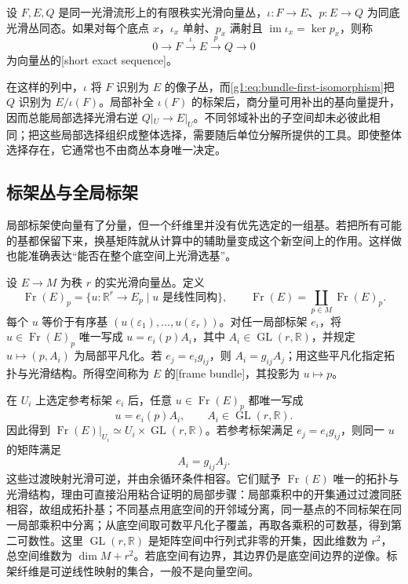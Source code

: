 \begin{definition}
	\label{g1:def:short-exact-bundle-sequence}
	设 \(F,E,Q\) 是同一光滑流形上的有限秩实光滑向量丛，\(\iota:F\to E\)、\(p:E\to Q\) 为同底光滑丛同态。如果对每个底点 \(x\)，\(\iota_x\) 单射、\(p_x\) 满射且 \(\operatorname{im}\iota_x=\ker p_x\)，则称
	\[
		0\longrightarrow F\xrightarrow{\ \iota\ }E\xrightarrow{\ p\ }Q\longrightarrow0
	\]
	为向量丛的[short exact sequence]。
\end{definition}

在这样的列中，\(\iota\) 将 \(F\) 识别为 \(E\) 的像子丛，而\eqref{g1:eq:bundle-first-isomorphism}把 \(Q\) 识别为 \(E/\iota(F)\)。局部补全 \(\iota(F)\) 的标架后，商分量可用补出的基向量提升，因而总能局部选择光滑右逆 \(Q|_U\to E|_U\)。不同邻域补出的子空间却未必彼此相同；把这些局部选择组织成整体选择，需要随后单位分解所提供的工具。即使整体选择存在，它通常也不由商丛本身唯一决定。

\subsection{标架丛与全局标架}
\label{g1:subsec:1201:04}

局部标架使向量有了分量，但一个纤维里并没有优先选定的一组基。若把所有可能的基都保留下来，换基矩阵就从计算中的辅助量变成这个新空间上的作用。这样做也能准确表达“能否在整个底空间上光滑选基”。

\begin{definition}
	\label{g1:def:frame-bundle}
	设 \(E\to M\) 为秩 \(r\) 的实光滑向量丛。定义
	\[
		\operatorname{Fr}(E)_p=\{u:\mathbb R^r\to E_p\mid u\text{ 是线性同构}\},\qquad
		\operatorname{Fr}(E)=\coprod_{p\in M}\operatorname{Fr}(E)_p.
	\]
	每个 \(u\) 等价于有序基 \((u(\varepsilon_1),\ldots,u(\varepsilon_r))\)。对任一局部标架 \(e_i\)，将 \(u\in\operatorname{Fr}(E)_p\) 唯一写成 \(u=e_i(p)A_i\)，其中 \(A_i\in\operatorname{GL}(r,\mathbb R)\)，并规定 \(u\mapsto(p,A_i)\) 为局部平凡化。若 \(e_j=e_i g_{ij}\)，则 \(A_i=g_{ij}A_j\)；用这些平凡化指定拓扑与光滑结构。所得空间称为 \(E\) 的[frame bundle]，其投影为 \(u\mapsto p\)。
\end{definition}

在 \(U_i\) 上选定参考标架 \(e_i\) 后，任意 \(u\in\operatorname{Fr}(E)_p\) 都唯一写成
\[
	u=e_i(p)A_i,\qquad A_i\in\operatorname{GL}(r,\mathbb R).
\]
因此得到 \(\operatorname{Fr}(E)|_{U_i}\simeq U_i\times\operatorname{GL}(r,\mathbb R)\)。若参考标架满足 \(e_j=e_i g_{ij}\)，则同一 \(u\) 的矩阵满足
\begin{equation}
	\label{g1:eq:frame-bundle-transition}
	A_i=g_{ij}A_j.
\end{equation}
这些过渡映射光滑可逆，并由余循环条件相容。它们赋予 \(\operatorname{Fr}(E)\) 唯一的拓扑与光滑结构，理由可直接沿用粘合证明的局部步骤：局部乘积中的开集通过过渡同胚相容，故组成拓扑基；不同基点用底空间的开邻域分离，同一基点的不同标架在同一局部乘积中分离；从底空间取可数平凡化子覆盖，再取各乘积的可数基，得到第二可数性。这里 \(\operatorname{GL}(r,\mathbb R)\) 是矩阵空间中行列式非零的开集，因此维数为 \(r^2\)，总空间维数为 \(\dim M+r^2\)。若底空间有边界，其边界仍是底空间边界的逆像。标架纤维是可逆线性映射的集合，一般不是向量空间。

